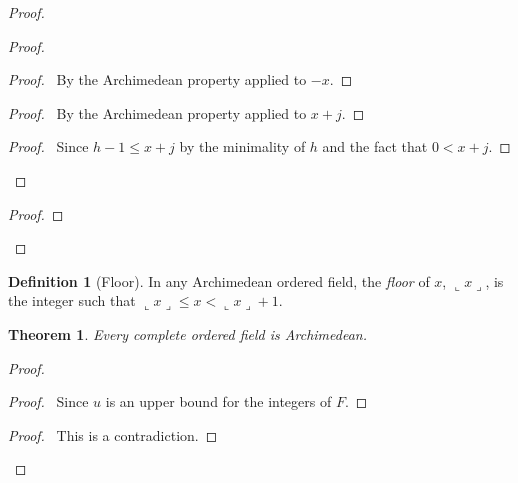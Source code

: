 \documentclass{article}
\let\qed\relax
\newtheorem{theorem}[axiom]{Theorem}
\theoremstyle{definition}
\newtheorem{definition}[axiom]{Definition}
\begin{document}
    \begin{proof}
        \pf
        \begin{proof}
            \begin{proof}
                \pf\ By the Archimedean property applied to $-x$.
            \end{proof}
            \begin{proof}
                \pf\ By the Archimedean property applied to $x + j$.
            \end{proof}
            \begin{proof}
                \pf\ Since $h - 1 \leq x + j$ by the minimality of $h$ and the fact that $0 < x + j$.
            \end{proof}
        \end{proof}
        \begin{proof}
        \end{proof}
        \qed
    \end{proof}

    \begin{definition}[Floor]
        In any Archimedean ordered field, the \emph{floor} of $x$, $\llcorner x \lrcorner$, is the integer
        such that $\llcorner x \lrcorner \leq x < \llcorner x \lrcorner + 1$.
    \end{definition}

    \begin{theorem}
        Every complete ordered field is Archimedean.
    \end{theorem}

    \begin{proof}
        \pf
        \begin{proof}
            \pf\ Since $u$ is an upper bound for the integers of $F$.
        \end{proof}
        \qedstep
        \begin{proof}
            \pf\ This is a contradiction.
        \end{proof}
        \qed
    \end{proof}
\end{document}

